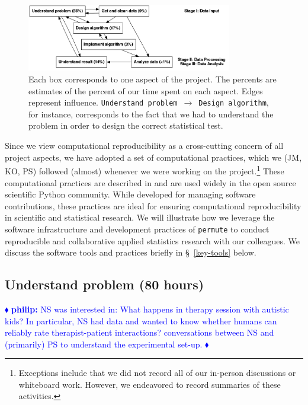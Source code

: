 \documentclass[]{article}
\newcommand{\philip}[1] { \textcolor{blue} {
\ensuremath{\blacklozenge} {\bf philip:}  {#1}
\ensuremath{\blacklozenge} } }
\begin{document}
\begin{figure}[h]
  \centering
    \includegraphics[width=0.8\textwidth]{_fig/work_process_bids.png}
  \caption{
  \small
    Each box corresponds to one aspect of the project.
    The percents are estimates of the percent of our time spent on each aspect.
    Edges represent influence.
    \texttt{Understand problem}~$\to$~\texttt{Design algorithm}, for instance,
    corresponds to the fact that we had to understand the problem in order to
    design the correct statistical test.\label{fig:work_process}}
\end{figure}

Since we view computational reproducibility as a cross-cutting concern of all
project aspects, we have adopted a set of computational practices, which we
(JM, KO, PS) followed (almost) whenever we were working on the
project.\footnote{Exceptions include that we did not record all of our
in-person discussions or whiteboard work.  
However, we endeavored to
record summaries of these activities.}
These computational practices are described in \citet{millman2014developing}
and are used widely in the open source scientific Python community.
While developed for managing software contributions, these practices are ideal
for ensuring computational reproducibility in scientific and statistical
research.
We will illustrate how we leverage the software infrastructure and development
practices of \texttt{permute} to conduct reproducible and collaborative applied
statistics research with our colleagues.
We discuss the software tools and practices briefly in \S~\ref{key-tools} below.

\subsection{Understand problem (80 hours)}

\philip{
NS was interested in:  What happens in therapy session with autistic kids?
In particular, NS had data and wanted to know whether humans can reliably rate
therapist-patient interactions?
conversations between NS and (primarily) PS to understand the experimental
set-up.
}
\end{document}
